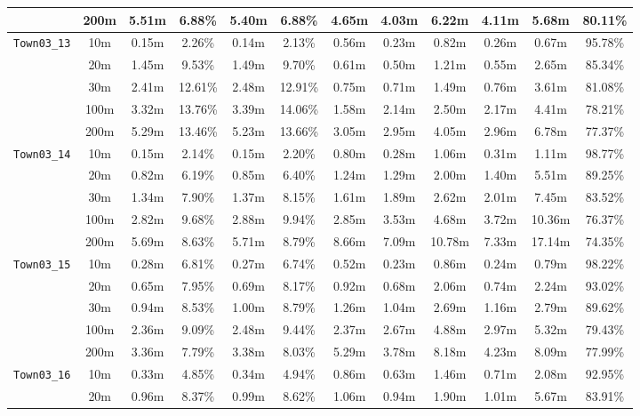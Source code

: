 \begin{table}
{\begin{tabular}{@{}cccccccccccc@{}}
      & 200m & 5.51m & 6.88\% & 5.40m & 6.88\% & 4.65m & 4.03m & 6.22m & 4.11m & 5.68m & 80.11\% \\
      \midrule
      \multirow{5}{*}{\Verb|Town03_13|} & 10m & 0.15m & 2.26\% & 0.14m & 2.13\% & 0.56m & 0.23m & 0.82m & 0.26m & 0.67m & 95.78\% \\
      & 20m & 1.45m & 9.53\% & 1.49m & 9.70\% & 0.61m & 0.50m & 1.21m & 0.55m & 2.65m & 85.34\% \\
      & 30m & 2.41m & 12.61\% & 2.48m & 12.91\% & 0.75m & 0.71m & 1.49m & 0.76m & 3.61m & 81.08\% \\
      & 100m & 3.32m & 13.76\% & 3.39m & 14.06\% & 1.58m & 2.14m & 2.50m & 2.17m & 4.41m & 78.21\% \\
      & 200m & 5.29m & 13.46\% & 5.23m & 13.66\% & 3.05m & 2.95m & 4.05m & 2.96m & 6.78m & 77.37\% \\
      \midrule
      \multirow{5}{*}{\Verb|Town03_14|} & 10m & 0.15m & 2.14\% & 0.15m & 2.20\% & 0.80m & 0.28m & 1.06m & 0.31m & 1.11m & 98.77\% \\
      & 20m & 0.82m & 6.19\% & 0.85m & 6.40\% & 1.24m & 1.29m & 2.00m & 1.40m & 5.51m & 89.25\% \\
      & 30m & 1.34m & 7.90\% & 1.37m & 8.15\% & 1.61m & 1.89m & 2.62m & 2.01m & 7.45m & 83.52\% \\
      & 100m & 2.82m & 9.68\% & 2.88m & 9.94\% & 2.85m & 3.53m & 4.68m & 3.72m & 10.36m & 76.37\% \\
      & 200m & 5.69m & 8.63\% & 5.71m & 8.79\% & 8.66m & 7.09m & 10.78m & 7.33m & 17.14m & 74.35\% \\
      \midrule
      \multirow{5}{*}{\Verb|Town03_15|} & 10m & 0.28m & 6.81\% & 0.27m & 6.74\% & 0.52m & 0.23m & 0.86m & 0.24m & 0.79m & 98.22\% \\
      & 20m & 0.65m & 7.95\% & 0.69m & 8.17\% & 0.92m & 0.68m & 2.06m & 0.74m & 2.24m & 93.02\% \\
      & 30m & 0.94m & 8.53\% & 1.00m & 8.79\% & 1.26m & 1.04m & 2.69m & 1.16m & 2.79m & 89.62\% \\
      & 100m & 2.36m & 9.09\% & 2.48m & 9.44\% & 2.37m & 2.67m & 4.88m & 2.97m & 5.32m & 79.43\% \\
      & 200m & 3.36m & 7.79\% & 3.38m & 8.03\% & 5.29m & 3.78m & 8.18m & 4.23m & 8.09m & 77.99\% \\
      \midrule
      \multirow{5}{*}{\Verb|Town03_16|} & 10m & 0.33m & 4.85\% & 0.34m & 4.94\% & 0.86m & 0.63m & 1.46m & 0.71m & 2.08m & 92.95\% \\
      & 20m & 0.96m & 8.37\% & 0.99m & 8.62\% & 1.06m & 0.94m & 1.90m & 1.01m & 5.67m & 83.91\% \\

\end{tabular}}
\end{table}
